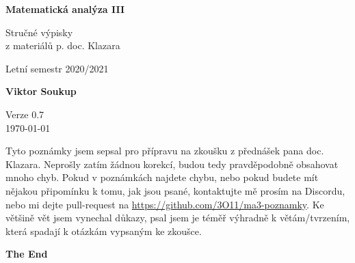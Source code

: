 \documentclass[11pt]{article}
\theoremstyle{nontheoremstyle}
\theoremstyle{nontheoremstylenodot}
\theoremstyle{theoremstyle}
\begin{document}
\begin{titlepage}
    \begin{center}
        \vspace*{1cm}
            
        \Huge
        \textbf{Matematická analýza III}
            
        \vspace{0.5cm}
        \LARGE
        Stručné výpisky
        \\

        z materiálů p. doc. Klazara

        \vspace{5mm}
        
        Letní semestr 2020/2021
        
        \vspace{1.5cm}
            
        \textbf{Viktor Soukup}
        
        \vfill
        \flushright
        \normalsize
        Verze 0.7\\
        \today
        
    \end{center}
\end{titlepage}

Tyto poznámky jsem sepsal pro přípravu na zkoušku z přednášek pana doc. Klazara.
Neprošly zatím žádnou korekcí, budou tedy pravděpodobně obsahovat mnoho chyb.
Pokud v poznámkách najdete chybu, nebo pokud budete mít nějakou připomínku k tomu,
jak jsou psané, kontaktujte mě prosím na Discordu, nebo mi dejte pull-request na
\url{https://github.com/3O11/ma3-poznamky}. Ke většině vět jsem vynechal důkazy,
psal jsem je téměř výhradně k větám/tvrzením, která spadají k otázkám vypsaným ke zkoušce.
\clearpage

\tableofcontents
\clearpage







\vfill
\begin{center}
\LARGE
\textbf{The End}
\end{center}
\end{document}
